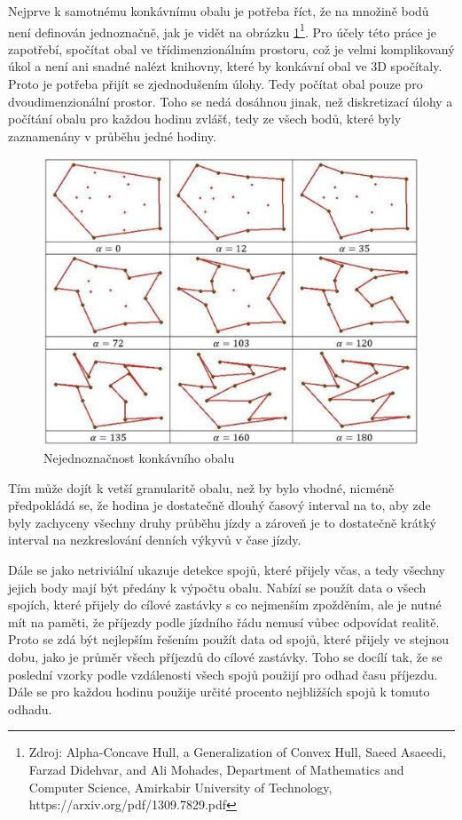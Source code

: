 Nejprve k samotnému konkávnímu obalu je potřeba říct, že na množině bodů není definován jednoznačně, jak je vidět na obrázku \ref{fig:konkavni_obal_nejednoznacny}\footnote{Zdroj: Alpha-Concave Hull, a Generalization of Convex Hull, Saeed Asaeedi, Farzad Didehvar, and Ali Mohades, Department of Mathematics and Computer Science, Amirkabir University of Technology, https://arxiv.org/pdf/1309.7829.pdf}. Pro účely této práce je zapotřebí, spočítat obal ve třídimenzionálním prostoru, což je velmi komplikovaný úkol a není ani snadné nalézt knihovny, které by konkávní obal ve 3D spočítaly. Proto je potřeba přijít se zjednodušením úlohy. Tedy počítat obal pouze pro dvoudimenzionální prostor. Toho se nedá dosáhnou jinak, než diskretizací úlohy a počítání obalu pro každou hodinu zvlášť, tedy ze všech bodů, které byly zaznamenány v průběhu jedné hodiny.


\begin{figure}
\centering
  \includegraphics[width=0.8\linewidth]{../img/konkavni_obal_nejednoznacny.png}
  \caption{Nejednoznačnost konkávního obalu}
  \label{fig:konkavni_obal_nejednoznacny}
\end{figure}


\bigbreak


 Tím může dojít k vetší granularitě obalu, než by bylo vhodné, nicméně předpokládá se, že hodina je dostatečně dlouhý časový interval na to, aby zde byly zachyceny všechny druhy průběhu jízdy a zároveň je to dostatečně krátký interval na nezkreslování denních výkyvů v čase jízdy.


 \bigbreak


Dále se jako netriviální ukazuje detekce spojů, které přijely včas, a tedy všechny jejich body mají být předány k výpočtu obalu. Nabízí se použít data o všech spojích, které přijely do cílové zastávky s co nejmenším zpožděním, ale je nutné mít na paměti, že příjezdy podle jízdního řádu nemusí vůbec odpovídat realitě. Proto se zdá být nejlepším řešením použít data od spojů, které přijely ve stejnou dobu, jako je průměr všech příjezdů do cílové zastávky. Toho se docílí tak, že se poslední vzorky podle vzdálenosti všech spojů použijí pro odhad času příjezdu. Dále se pro každou hodinu použije určité procento nejbližších spojů k tomuto odhadu.


